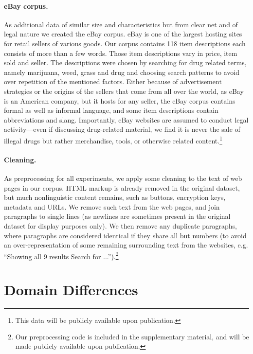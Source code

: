\documentclass[11pt,a4paper,table]{article}
\begin{document}

\paragraph{eBay corpus.}
As additional data of similar size and characteristics but from clear net and of legal nature we created the eBay corpus. eBay is one of the largest hosting sites for retail sellers of various goods. Our corpus contains 118 item descriptions each consists of more than a few words. Those item descriptions vary in price, item sold and seller. The descriptions were chosen by searching for drug related terms, namely marijuana, weed, grass and drug and choosing search patterns to avoid over repetition of the mentioned factors. Either because of advertisement strategies or the origins of the sellers that come from all over the world, as eBay is an American company, but it hosts for any seller, the eBay corpus contains formal as well as informal language, and some item descriptions contain abbreviations and slang.
Importantly, eBay websites are assumed to conduct legal activity---even
if discussing drug-related material, we find it is never the sale of illegal
drugs but rather merchandise, tools, or otherwise related content.\footnote{This 
data will be publicly available upon publication.}

\paragraph{Cleaning.} 
As preprocessing for all experiments, we apply some cleaning to the text
of web pages in our corpus.
HTML markup is already removed in the original dataset,
but much nonlinguistic content remains, such as
buttons, encryption keys, metadata and URLs.
We remove such text from the web pages, and join paragraphs 
to single lines (as newlines are sometimes present in the original dataset for display purposes only).
We then remove any duplicate paragraphs, where paragraphs are considered
identical if they share all but numbers (to avoid an over-representation of some remaining surrounding text from the websites, e.g. ``Showing all 9 results Search for ...'').\footnote{Our preprocessing code is included in the supplementary material, and will be made publicly available upon publication.}

\section{Domain Differences}
\end{document}
